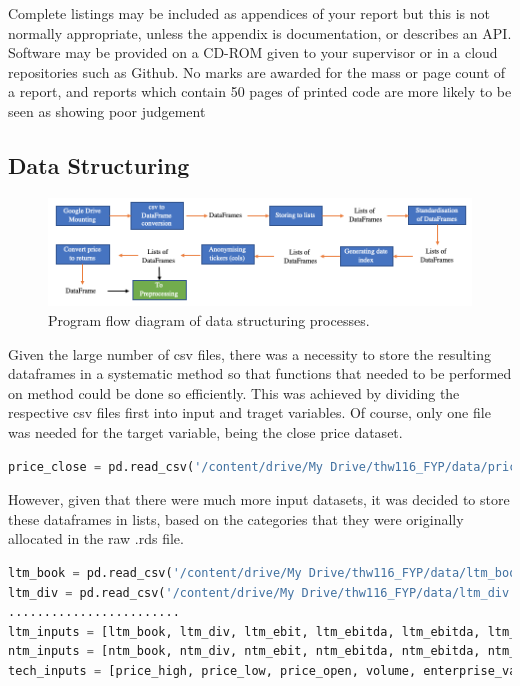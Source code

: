 \documentclass[10pt,onecolumn,letterpaper]{article}
\begin{document}
Complete listings may be included as appendices of your report but this is not normally appropriate, unless the appendix is documentation, or describes an API. Software may be provided on a CD-ROM given to your supervisor or in a cloud repositories such as Github. No marks are awarded for the mass or page count of a report, and reports which contain 50 pages of printed code are more likely to be seen as showing poor judgement
\fi

\subsection{Data Structuring}
 
\begin{figure}[!hbt!]
\centering
\includegraphics[width=\columnwidth]{data_structuring.png}
\caption{Program flow diagram of data structuring processes.}
\label{data_structuring}
\end{figure}
 
Given the large number of csv files, there was a necessity to store the resulting dataframes in a systematic method so that functions that needed to be performed on method could be done so efficiently. This was achieved by dividing the respective csv files first into input and traget variables. Of course, only one file was needed for the target variable, being the close price dataset. 

\begin{lstlisting}[language=Python, breaklines=true]
price_close = pd.read_csv('/content/drive/My Drive/thw116_FYP/data/price_close.csv')
\end{lstlisting}

However, given that there were much more input datasets, it was decided to store these dataframes in lists, based on the categories that they were originally allocated in the raw .rds file. 

\begin{lstlisting}[language=Python, breaklines=true]
ltm_book = pd.read_csv('/content/drive/My Drive/thw116_FYP/data/ltm_book.csv')
ltm_div = pd.read_csv('/content/drive/My Drive/thw116_FYP/data/ltm_div.csv')
........................
ltm_inputs = [ltm_book, ltm_div, ltm_ebit, ltm_ebitda, ltm_ebitda, ltm_eps, ltm_fcf, ltm_pbook, ltm_sales] 
ntm_inputs = [ntm_book, ntm_div, ntm_ebit, ntm_ebitda, ntm_ebitda, ntm_eps, ntm_fcf, ntm_pbook, ntm_sales]
tech_inputs = [price_high, price_low, price_open, volume, enterprise_val]
\end{lstlisting} 
\end{document}

